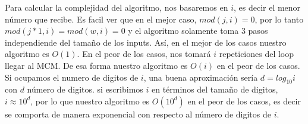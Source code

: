 Para calcular la complejidad del algoritmo, nos basaremos en $i$, es decir el menor número que recibe. Es facil ver que en el mejor caso, $mod (j, i) = 0$, por lo tanto $mod (j * 1, i ) = mod(w, i) = 0$ y el algoritmo solamente toma 3 pasos independiende del tamaño de los inputs. Así, en el mejor de los casos nuestro algoritmo es $O(1)$. En el peor de los casos, nos tomará $i$ repeticiones del loop llegar al MCM. De esa forma nuestro algoritmo es $O(i)$ en el peor de los casos. Si ocupamos el numero de digitos de $i$, una buena aproximación sería $d = log_{10} i$ con $d$ número de digitos. si escribimos $i$ en términos del tamaño de digitos, $i \approx 10^d$, por lo que nuestro algoritmo es $O(10^d)$ en el peor de los casos, es decir se comporta de manera exponencial con respecto al número de digitos de $i$.
